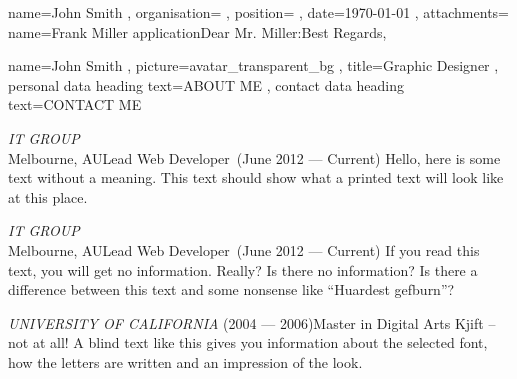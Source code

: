 \documentclass[a4paper, 12pt]{classycv}
\begin{document}

\begin{CoverLetter}{%
    name=John Smith%
    , organisation=%
    , position=%
    , date=\today%
    , attachments=%
}{%
    name=Frank Miller%
}{application}{Dear Mr. Miller:}{Best Regards,}%
    \blindtext[1]

    \blindtext[3]

    \blindtext[2]
\end{CoverLetter}

\begin{Resume}[%
    left background color=accent-color%
    , left foreground color=white%
    , left header color=white%
    , delimiter color=white%
    , delimiter width=0pt%
]{%
    name=John Smith%
    , picture={avatar_transparent_bg}%
    , title=Graphic Designer%
    , personal data heading text={\MakeUppercase{about me}}%
    , contact data heading text={\MakeUppercase{contact me}}%
}%
    \begin{Entry}[skip above=0pt]{\textit{\MakeUppercase{IT Group}}\\Melbourne, AU}{Lead Web Developer~(June 2012 --- Current)}%
        Hello, here is some text without a meaning. This text should show what a printed text will look like at this place.%
    \end{Entry}%
    \begin{Entry}[skip above=0pt]{\textit{\MakeUppercase{IT Group}}\\Melbourne, AU}{Lead Web Developer~(June 2012 --- Current)}%
        If you read this text, you will get no information. Really? Is there no information? Is there a difference between this text and some nonsense like “Huardest gefburn”?%
    \end{Entry}%
    \begin{Entry}[skip above=0pt]{\textit{\MakeUppercase{University of California}} (2004 --- 2006)}{Master in Digital Arts}%
        Kjift – not at all! A blind text like this gives you information about the selected font, how the letters are written and an impression of the look.%
    \end{Entry}%

\end{Resume}
\end{document}
